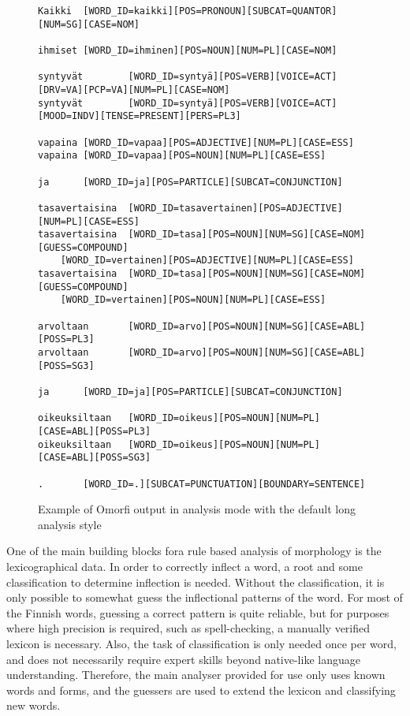 \documentclass[a4paper,12pt]{article}
\begin{document}
\begin{figure}
    \begin{scriptsize}
\begin{verbatim}
Kaikki  [WORD_ID=kaikki][POS=PRONOUN][SUBCAT=QUANTOR][NUM=SG][CASE=NOM]

ihmiset [WORD_ID=ihminen][POS=NOUN][NUM=PL][CASE=NOM]

syntyvät        [WORD_ID=syntyä][POS=VERB][VOICE=ACT][DRV=VA][PCP=VA][NUM=PL][CASE=NOM]
syntyvät        [WORD_ID=syntyä][POS=VERB][VOICE=ACT][MOOD=INDV][TENSE=PRESENT][PERS=PL3]

vapaina [WORD_ID=vapaa][POS=ADJECTIVE][NUM=PL][CASE=ESS]
vapaina [WORD_ID=vapaa][POS=NOUN][NUM=PL][CASE=ESS]

ja      [WORD_ID=ja][POS=PARTICLE][SUBCAT=CONJUNCTION]

tasavertaisina  [WORD_ID=tasavertainen][POS=ADJECTIVE][NUM=PL][CASE=ESS]
tasavertaisina  [WORD_ID=tasa][POS=NOUN][NUM=SG][CASE=NOM][GUESS=COMPOUND]
    [WORD_ID=vertainen][POS=ADJECTIVE][NUM=PL][CASE=ESS]
tasavertaisina  [WORD_ID=tasa][POS=NOUN][NUM=SG][CASE=NOM][GUESS=COMPOUND]
    [WORD_ID=vertainen][POS=NOUN][NUM=PL][CASE=ESS]

arvoltaan       [WORD_ID=arvo][POS=NOUN][NUM=SG][CASE=ABL][POSS=PL3]
arvoltaan       [WORD_ID=arvo][POS=NOUN][NUM=SG][CASE=ABL][POSS=SG3]

ja      [WORD_ID=ja][POS=PARTICLE][SUBCAT=CONJUNCTION]

oikeuksiltaan   [WORD_ID=oikeus][POS=NOUN][NUM=PL][CASE=ABL][POSS=PL3]
oikeuksiltaan   [WORD_ID=oikeus][POS=NOUN][NUM=PL][CASE=ABL][POSS=SG3]

.       [WORD_ID=.][SUBCAT=PUNCTUATION][BOUNDARY=SENTENCE]
\end{verbatim}
    \end{scriptsize}
    \caption{Example of Omorfi output in analysis mode with the default
        long analysis style \label{fig:output-example}}
\end{figure}

One of the main building blocks fora  rule based analysis of morphology is the
lexicographical data. In order to correctly inflect a word, a root and some
classification to determine inflection is needed. Without the classification,
it is only possible to somewhat guess the inflectional patterns of the word.
For most of the Finnish words, guessing a correct pattern is quite reliable,
but for purposes where high precision is required, such as spell-checking, a
manually verified lexicon is necessary.  Also, the task of classification is
only needed once per word, and does not necessarily require expert skills
beyond native-like language understanding.  Therefore, the main analyser
provided for use only uses known words and forms, and the guessers are used
to extend the lexicon and classifying new words.
\end{document}

